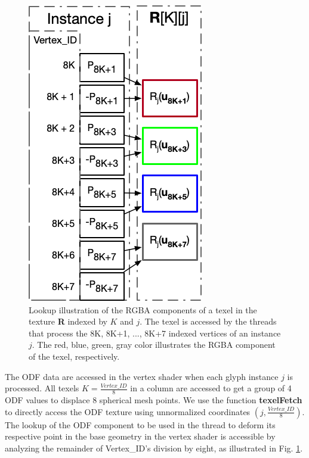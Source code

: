 \documentclass[twoside,twocolumn,10pt]{article}
\begin{document}
\begin{figure}[ht]
    \centering
    \includegraphics[width=0.7\linewidth, angle=0]{figs/rendering_scheme/texellookup.png}
    \caption{Lookup illustration of the RGBA components of a texel in the texture \textbf{R} indexed by $K$ and $j$. The texel is accessed by the threads that process the 8K, 8K+1, ..., 8K+7 indexed vertices of an instance $j$. The red, blue, green, gray color illustrates the RGBA component of the texel, respectively.}
    \label{fig::texelfetch}
\end{figure}

 
 The ODF data are accessed in the vertex shader when each glyph instance $j$ is processed. All texels $K = \frac{Vertex\_ID}{8}$ in a column are accessed to get a group of 4 ODF values to displace 8 spherical mesh points. We use the function {\bf texelFetch} to directly access the ODF texture using unnormalized coordinates $(j, \frac{Vertex\_ID}{8})$. The lookup of the ODF component to be used in the thread to deform its respective point in the base geometry in the vertex shader is accessible by analyzing the remainder of Vertex\_ID's division by eight, as illustrated in Fig. \ref{fig::texelfetch}.
\end{document}
